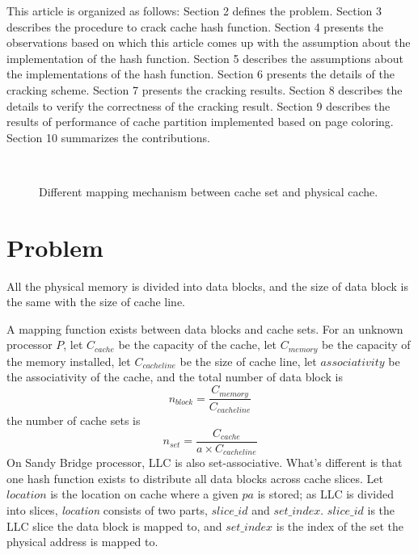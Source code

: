 \documentclass[conference]{IEEEtran}
\newcommand{\NumberBlock}{n_{block}}
\newcommand{\Associativity}{associativity }
\newcommand{\NumberSet}{n_{set}}
\newcommand{\SliceID}{slice\_id }
\newcommand{\SetIndex}{set\_index}
\newcommand{\PhysicalAddressAbbreviation}{pa}
\newcommand{\MA}{\PhysicalAddressAbbreviation}
\begin{document}
This article is organized as follows: Section 2 defines the problem. Section 3 describes the procedure to crack cache hash function. Section 4 presents the observations based on which this article comes up with the assumption about the implementation of the hash function. Section 5 describes the assumptions about the implementations of the hash function. Section 6 presents the details of the cracking scheme. Section 7 presents the cracking results. Section 8 describes the details to verify the correctness of the cracking result. Section 9 describes the results of performance of cache partition implemented based on page coloring. Section 10 summarizes the contributions.
\begin{figure*}[!htbp]
\centering
{}
	~
	\caption{Different mapping mechanism between cache set and physical cache.}
	\label{fig:PhysicalMappingScheme}
\end{figure*}
\section{Problem}
All the physical memory is divided into data blocks, and the size of data block is the same with the size of cache line.

A mapping function exists between data blocks and cache sets. For an unknown processor $P$, let $C_{cache}$ be the capacity of the cache, let $C_{memory}$ be the capacity of the memory installed, 
let $C_{cacheline}$ be the size of cache line, let $\Associativity$ be the associativity of the cache, and the total number of data block is 
\begin{equation}
	\NumberBlock = \frac{C_{memory}}{C_{cacheline}}
\end{equation}
the number of cache sets is 
\begin{equation}
\NumberSet = \frac{C_{cache}}{a \times C_{cacheline}}
\end{equation}
On Sandy Bridge processor, LLC is also set-associative. What's different is that one hash function exists to distribute all data blocks across cache slices.
Let $location$ is the location on cache where a given $\MA$ is stored; as LLC is divided into slices, \emph{location} consists of two parts, $\SliceID$ and $\SetIndex$. $\SliceID$ is the LLC slice the data block is mapped to, and $\SetIndex$ is the index of the set the physical address is mapped to. 
\end{document}
